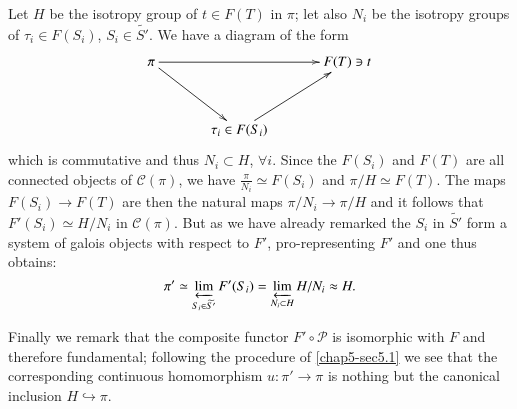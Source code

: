 Let $H$ be the isotropy group of $t\in F(T)$ in $\pi$; let also
$N_{i}$ be the isotropy groups of $\tau_{i}\in F(S_{i})$,
$S_{i}\in\widetilde{S'}$. We have a diagram of the form
\[
\xymatrix@=1.2cm{
\pi \ar[rr]\ar[dr] & & F(T)\ni t\\
 & \tau_{i}\in F(S_{i})\ar[ur] &
}
\]
which is commutative and thus $N_{i}\subset H$, $\forall i$. Since the
$F(S_{i})$ and $F(T)$ are all connected objects of $\mathscr{C}(\pi)$,
we have $\frac{\pi}{N_{i}}\simeq F(S_{i})$ and $\pi/H\simeq F(T)$. The
maps $F(S_{i})\to F(T)$ are then the natural maps $\pi/N_{i}\to \pi/H$
and it follows that $F'(S_{i})\simeq H/N_{i}$ in
$\mathscr{C}(\pi)$. But as we have already remarked the $S_{i}$ in
$\widetilde{S'}$ form a system of galois objects with respect to $F'$,
pro-representing $F'$ and one thus obtains:
$$
\pi'\simeq
\varprojlim_{S_{i}\in\widetilde{S'}}F'(S_{i})=\varprojlim_{N_{i}\subset
  H}H/N_{i}\approx H.
$$

Finally we remark that the composite functor $F'\circ \mathscr{P}$ is
isomorphic with $F$ and therefore fundamental; following the procedure
of \ref{chap5-sec5.1} we see that the corresponding continuous homomorphism
$u:\pi'\to \pi$ is nothing but the canonical inclusion
$H\hookrightarrow \pi$. 
